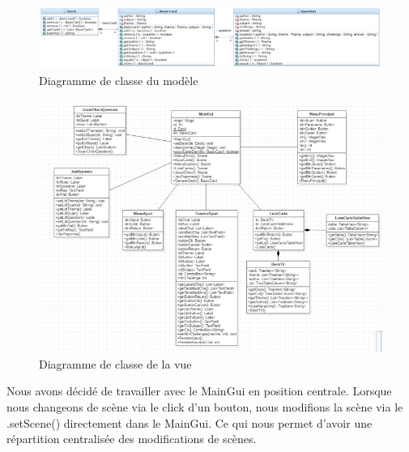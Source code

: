 \begin{figure}[h]
	\centering
	\includegraphics[width=\textwidth]{TTMC_Model_Diagram.png}
	\caption{Diagramme de classe du modèle}
	\label{fig:diag_modele}
\end{figure}

\begin{figure}[h]
	\centering
	\includegraphics[width=\textwidth]{DiagrammeClasseVue.png}
	\caption{Diagramme de classe de la vue}
	\label{fig:diag_vue}
\end{figure}

Nous avons décidé de travailler avec le MainGui en position centrale. Lorsque nous changeons de scène via le click d’un bouton, nous modifions la scène via le .setScene() directement dans le MainGui. Ce qui nous permet d’avoir une répartition centralisée des modifications de scènes.
